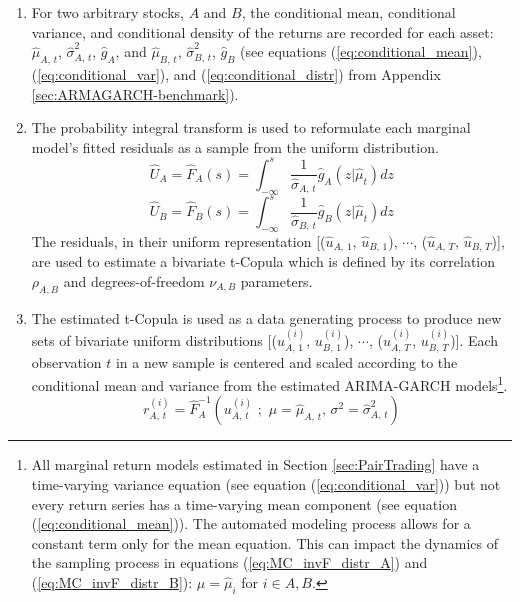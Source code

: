 \begin{enumerate}
    \item For two arbitrary stocks, $A$ and $B$, the conditional mean, conditional variance, and conditional density of the returns are recorded for each asset: $\hat{\mu}_{A,\,t}$, $\hat{\sigma}^{2}_{A,\,t}$, $\hat{g}_{A}$, and $\hat{\mu}_{B,\,t}$, $\hat{\sigma}^{2}_{B,\,t}$, $\hat{g}_{B}$ (see equations (\ref{eq:conditional_mean}), (\ref{eq:conditional_var}), and (\ref{eq:conditional_distr}) from Appendix \ref{sec:ARMAGARCH-benchmark}).
    \item The probability integral transform is used to reformulate each marginal model's fitted residuals as a sample from the uniform distribution.
    \begin{equation} \label{eq:MC_F_distr_A}
        \hat{U}_{A} = \hat{F}_{A}(s) = \int_{-\infty}^{s} \frac{1}{\hat{\sigma}_{A,\,t}} \hat{g}_{A} \left(z | \hat{\mu}_{t}\right) dz
    \end{equation}
    \begin{equation} \label{eq:MC_F_distr_B}
        \hat{U}_{B} = \hat{F}_{B}(s) = \int_{-\infty}^{s} \frac{1}{\hat{\sigma}_{B,\,t}} \hat{g}_{B} \left(z | \hat{\mu}_{t}\right) dz
    \end{equation}
    The residuals, in their uniform representation [($\hat{u}_{A,\,1}$, $\hat{u}_{B,\,1}$), $\cdots$, ($\hat{u}_{A,\,T}$, $\hat{u}_{B,\,T}$)], are used to estimate a bivariate t-Copula which is defined by its correlation $\rho_{A,B}$ and degrees-of-freedom $\nu_{A,B}$ parameters.
    \item The estimated t-Copula is used as a data generating process to produce new sets of bivariate uniform distributions [($u^{(i)}_{A,\,1}$, $u^{(i)}_{B,\,1}$), $\cdots$, ($u^{(i)}_{A,\,T}$, $u^{(i)}_{B,\,T}$)]. Each observation $t$ in a new sample is centered and scaled according to the conditional mean and variance from the estimated ARIMA-GARCH models\footnote{All marginal return models estimated in Section \ref{sec:PairTrading} have a time-varying variance equation (see equation (\ref{eq:conditional_var})) but not every return series has a time-varying mean component (see equation (\ref{eq:conditional_mean})). The automated modeling process allows for a constant term only for the mean equation. This can impact the dynamics of the sampling process in equations (\ref{eq:MC_invF_distr_A}) and (\ref{eq:MC_invF_distr_B}): $\mu=\hat{\mu}_{i}$ for $i \in {A,B}$.}.
    \begin{equation} \label{eq:MC_invF_distr_A}
        r^{(i)}_{A,\,t} = \hat{F}^{-1}_{A} \left(u^{(i)}_{A,\,t}\,\,;\,\, \mu=\hat{\mu}_{A,\,t},\, \sigma^{2}=\hat{\sigma}^{2}_{A,\,t} \right)

\end{equation}
\end{enumerate}
